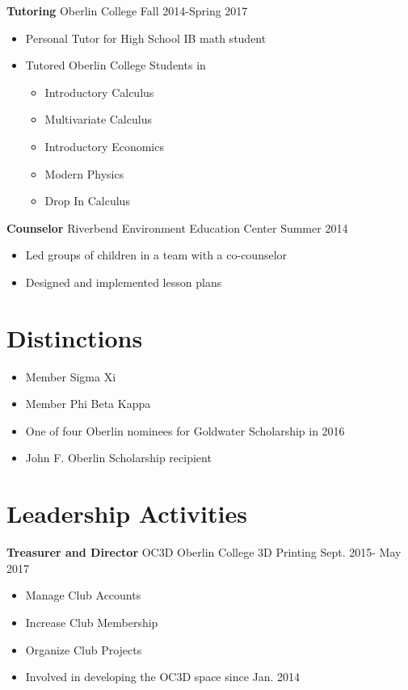 \documentclass[margin]{res}
\begin{document}
\begin{resume}
	{\bf Tutoring} Oberlin College \hfill Fall 2014-Spring 2017 \\
	\vspace{-4mm}
	\begin{itemize} \itemsep -2pt
		\item Personal Tutor for High School IB math student
		\item Tutored Oberlin College Students in
		\begin{itemize} \itemsep -2pt  %
			\item Introductory Calculus
			\item Multivariate Calculus
			\item Introductory Economics
			\item Modern Physics
			\item Drop In Calculus
		\end{itemize}
	\end{itemize}
	\vspace{-2mm}

	
	 
	{\bf Counselor} Riverbend Environment Education Center \hfill Summer 2014
	\begin{itemize} \itemsep -2pt  %
		\item Led groups of children in  a team with a co-counselor
		\item Designed and implemented lesson plans
	\end{itemize}
	 
	
	

	 \section{Distinctions}
	 \begin{itemize} \itemsep -2pt
		\item Member Sigma Xi
		\item Member Phi Beta Kappa
		\item One of four Oberlin nominees for Goldwater Scholarship in 2016
		\item John F. Oberlin Scholarship recipient
	\end{itemize}
	\section{Leadership   Activities} 
	{\bf Treasurer and Director} OC3D Oberlin College 3D Printing    \hfill         Sept. 2015- May 2017 
	\begin{itemize} \itemsep -2pt
		\item  Manage Club Accounts
		\item  Increase Club Membership
		\item  Organize Club Projects
		\item Involved in developing the OC3D space since Jan. 2014
	\end{itemize}
	

\end{resume}
\end{document}
